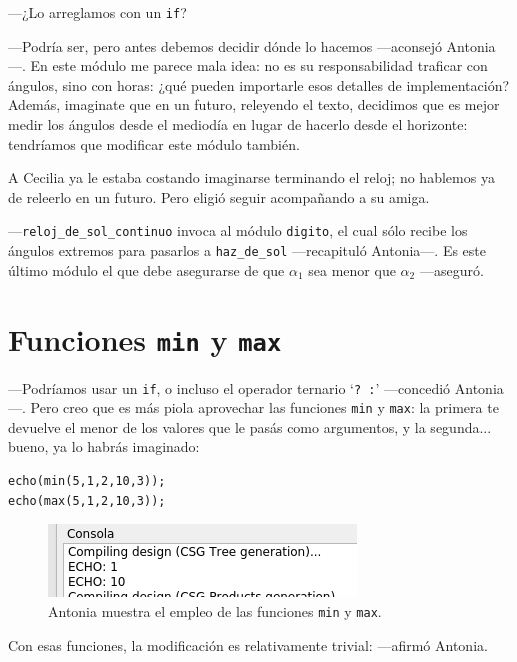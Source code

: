 ---¿Lo arreglamos con un \lstinline!if!?

---Podría ser, pero antes debemos decidir dónde lo hacemos ---aconsejó
Antonia---. En este módulo me parece mala idea: no es su
responsabilidad traficar con ángulos, sino con horas: ¿qué pueden
importarle esos detalles de implementación? Además, imaginate que en
un futuro, releyendo el texto, decidimos que es mejor medir los
ángulos desde el mediodía en lugar de hacerlo desde el horizonte:
tendríamos que modificar este módulo también.

A Cecilia ya le estaba costando imaginarse terminando el reloj; no
hablemos ya de releerlo en un futuro. Pero eligió seguir acompañando a
su amiga.

---\lstinline!reloj_de_sol_continuo! invoca al módulo
\lstinline!digito!, el cual sólo recibe los ángulos extremos para
pasarlos a \lstinline!haz_de_sol! ---re\-ca\-pi\-tu\-ló Antonia---.  Es este
último módulo el que debe asegurarse de que $\alpha_1$ sea menor que
$\alpha_2$ ---aseguró.

\section{Funciones \texttt{min} y \texttt{max}}

---Podríamos usar un \lstinline!if!, o incluso el operador ternario
`\lstinline!? :!' ---concedió Antonia---. Pero creo que es más piola
aprovechar las funciones \lstinline!min! y \lstinline!max!: la primera
te devuelve el menor de los valores que le pasás como argumentos, y la
segunda... bueno, ya lo habrás imaginado:

\begin{lstlisting}
echo(min(5,1,2,10,3));
echo(max(5,1,2,10,3));
\end{lstlisting}%

\begin{figure}[ht]
  \centering
  \includegraphics[width=.6\textwidth]{imagenes/min-max}  
  \caption{Antonia muestra el empleo de las funciones \lstinline!min!
    y \lstinline!max!.}
  \label{fig:min-max}
\end{figure}

\guillemotright Con esas funciones, la modificación es relativamente
trivial: ---afirmó Antonia.

